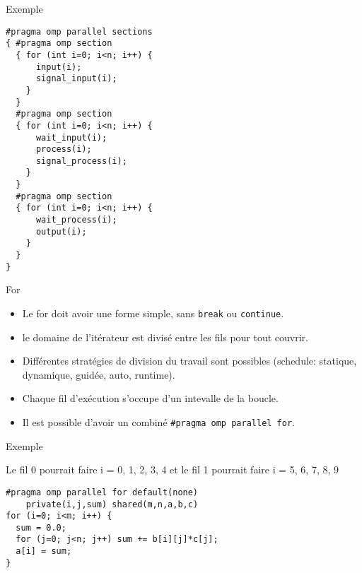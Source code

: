 \documentclass[10pt]{beamer}
\begin{document}
\begin{frame}[fragile]{Exemple}

  \scriptsize
  \begin{verbatim}
#pragma omp parallel sections
{ #pragma omp section
  { for (int i=0; i<n; i++) {
      input(i);
      signal_input(i);
    }
  }
  #pragma omp section
  { for (int i=0; i<n; i++) {
      wait_input(i);
      process(i);
      signal_process(i);
    }
  }
  #pragma omp section
  { for (int i=0; i<n; i++) {
      wait_process(i);
      output(i);
    }
  }
}
  \end{verbatim}
\end{frame}

\begin{frame}[fragile]{For}

  \begin{itemize}
    \item Le for doit avoir une forme simple, sans \texttt{break} ou \texttt{continue}.

    \item le domaine de l'itérateur est divisé entre les fils pour tout couvrir.

    \item Différentes stratégies de division du travail sont possibles (schedule: statique, dynamique, guidée, auto, runtime).

    \item Chaque fil d'exécution s'occupe d'un intevalle de la boucle.

    \item Il est possible d'avoir un combiné \verb|#pragma omp parallel for|.
  \end{itemize}
\end{frame}

\begin{frame}[fragile]{Exemple}

Le fil 0 pourrait faire i = 0, 1, 2, 3, 4 et le fil 1 pourrait faire i = 5, 6, 7, 8, 9
  \begin{verbatim}
#pragma omp parallel for default(none) 
    private(i,j,sum) shared(m,n,a,b,c)
for (i=0; i<m; i++) {
  sum = 0.0;
  for (j=0; j<n; j++) sum += b[i][j]*c[j];
  a[i] = sum;
}
  \end{verbatim}
\end{frame}
\end{document}

